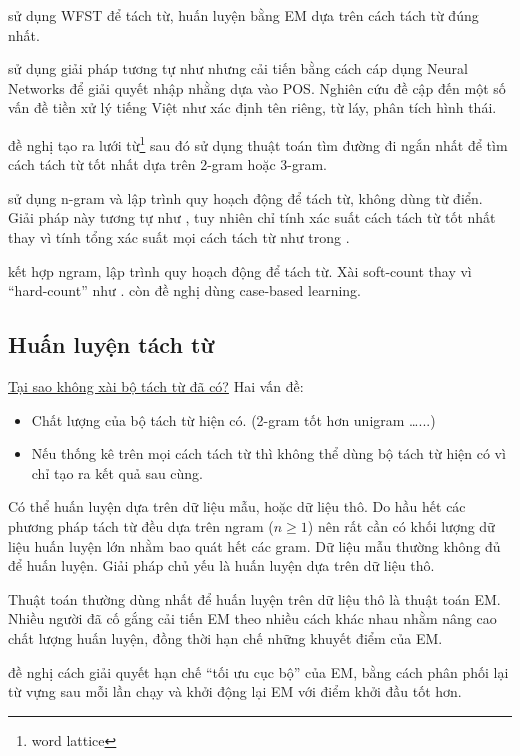 \documentclass[a4paper,oneside]{book} %
\newcommand{\note}[1]{\underline{#1}}
\begin{document}
\cite{Sproat} sử dụng WFST để tách từ, huấn luyện bằng EM dựa trên
cách tách từ đúng nhất.

\cite{wordseg} sử dụng giải pháp tương tự như \cite{Sproat} nhưng cải
tiến bằng cách cáp dụng Neural Networks để giải quyết nhập nhằng dựa
vào POS. Nghiên cứu đề cập đến một số vấn đề tiền xử lý tiếng Việt như
xác định tên riêng, từ láy, phân tích hình thái.

\cite{Ravishankar} đề nghị tạo ra lưới từ\footnote{word lattice} sau
đó sử dụng thuật toán tìm đường đi ngắn nhất để tìm cách tách từ tốt
nhất dựa trên 2-gram hoặc 3-gram.

\cite{LAH} sử dụng n-gram và lập trình quy hoạch động để tách từ,
không dùng từ điển. Giải pháp này tương tự như \cite{softcount}, tuy
nhiên chỉ tính xác suất cách tách từ tốt nhất thay vì tính tổng xác
suất mọi cách tách từ như trong \cite{softcount}.

\cite{Chunyu} kết hợp ngram, lập trình quy hoạch động để tách từ. Xài
soft-count thay vì ``hard-count'' như \cite{Chang}. \cite{Chunyu} còn
đề nghị dùng case-based learning.

\subsection{Huấn luyện tách từ}

\note{Tại sao không xài bộ tách từ đã có?} Hai vấn đề:
\begin{itemize}
\item Chất lượng của bộ tách từ hiện có. (2-gram tốt hơn unigram
  \ldots...)
\item Nếu thống kê trên mọi cách tách từ thì không thể dùng bộ tách từ
  hiện có vì chỉ tạo ra kết quả sau cùng.
\end{itemize}


Có thể huấn luyện dựa trên dữ liệu mẫu, hoặc dữ liệu thô. Do hầu hết
các phương pháp tách từ đều dựa trên ngram ($n\ge 1$) nên rất cần có
khối lượng dữ liệu huấn luyện lớn nhằm bao quát hết các gram. Dữ liệu
mẫu thường không đủ để huấn luyện. Giải pháp chủ yếu là huấn luyện dựa
trên dữ liệu thô.

Thuật toán thường dùng nhất để huấn luyện trên dữ liệu thô là thuật
toán EM. Nhiều người đã cố gắng cải tiến EM theo nhiều cách khác nhau
nhằm nâng cao chất lượng huấn luyện, đồng thời hạn chế những khuyết
điểm của EM. 

\cite{self-supervised} đề nghị cách giải quyết hạn chế ``tối ưu cục
bộ'' của EM, bằng cách phân phối lại từ vựng sau mỗi lần chạy và khởi
động lại EM với điểm khởi đầu tốt hơn.
\end{document}
